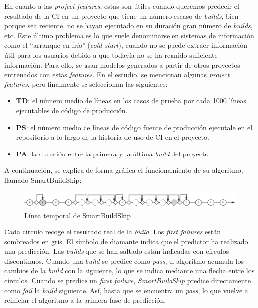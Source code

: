 En cuanto a las \textit{project features}, estas son útiles cuando queremos predecir
el resultado de la CI en un proyecto que tiene un número escaso de \textit{builds}, bien
porque sea reciente, no se hayan ejecutado en su duración gran número de \textit{builds}, etc. Este
último problema es lo que suele denominarse en sistemas de información como el ``arranque en frío''
(\textit{cold start}), cuando no se puede extraer información útil para los usuarios debido a
que todavía no se ha reunido suficiente información. Para ello, se usan modelos generados a partir
de otros proyectos entrenados con estas \textit{features}. En el estudio, se mencionan algunas
\textit{project features}, pero finalmente se seleccionan las siguientes:

\begin{itemize}
      \item \textbf{TD}: el número medio de líneas en los casos de prueba por cada
      1000 líneas ejecutables de código de producción.
      \item \textbf{PS}: el número medio de líneas de código fuente de producción
      ejecutale en el repositorio a lo largo de la historia de uso de CI en el proyecto.
      \item \textbf{PA}: la duración entre la primera y la última \textit{build} del
      proyecto
\end{itemize}


\noindent A continuación, se explica de forma gráfica el funcionamiento de su algoritmo, llamado
SmartBuildSkip:

\begin{figure}[H]
      \centering
      \includegraphics[scale=0.49]{images/SBS.png}
      \caption{Línea temporal de SmartBuildSkip \cite{2}.}
      \label{fig:timeline SBS}
\end{figure}

Cada círculo recoge el resultado real de la \textit{build}. Los \textit{first failures} están
sombreados en gris. El símbolo de diamante indica que el predictor ha realizado una predicción.
Las \textit{builds} que se han saltado están indicadas con círculos discontinuos. Cuando una
\textit{build} se predice como \textit{pass}, el algoritmo acumula los cambios de la
\textit{build} con la siguiente, lo que se indica mediante una flecha entre los círculos. Cuando
se predice un \textit{first failure}, \textit{SmartBuildSkip} predice directamente como
\textit{fail} la \textit{build} siguiente. Así, hasta que se encuentra un \textit{pass}, lo que
vuelve a reiniciar el algoritmo a la primera fase de predicción.\\

